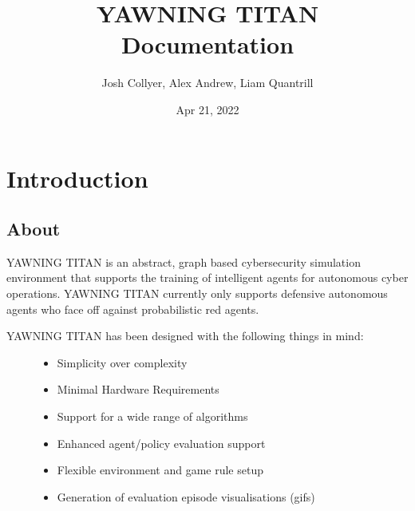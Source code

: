 \documentclass[letterpaper,10pt,english]{sphinxmanual}
\title{YAWNING TITAN Documentation}
\date{Apr 21, 2022}
\author{Josh Collyer, Alex Andrew, Liam Quantrill}
\begin{document}
\pagestyle{empty}
\sphinxmaketitle
\pagestyle{plain}
\sphinxtableofcontents
\pagestyle{normal}
\label{\detokenize{index::doc}}



\chapter{Introduction}
\label{\detokenize{source/intro:introduction}}\label{\detokenize{source/intro::doc}}

\section{About}
\label{\detokenize{source/intro:about}}
\sphinxAtStartPar
YAWNING TITAN is an abstract, graph based cyber\sphinxhyphen{}security simulation environment that supports the training of
intelligent agents for autonomous cyber operations. YAWNING TITAN currently only supports defensive autonomous agents
who face off against probabilistic red agents.
\begin{description}
\item[{YAWNING TITAN has been designed with the following things in mind:}] \leavevmode\begin{itemize}
\item {}
\sphinxAtStartPar
Simplicity over complexity

\item {}
\sphinxAtStartPar
Minimal Hardware Requirements

\item {}
\sphinxAtStartPar
Support for a wide range of algorithms

\item {}
\sphinxAtStartPar
Enhanced agent/policy evaluation support

\item {}
\sphinxAtStartPar
Flexible environment and game rule setup

\item {}
\sphinxAtStartPar
Generation of evaluation episode visualisations (gifs)

\end{itemize}

\end{description}
\end{document}
